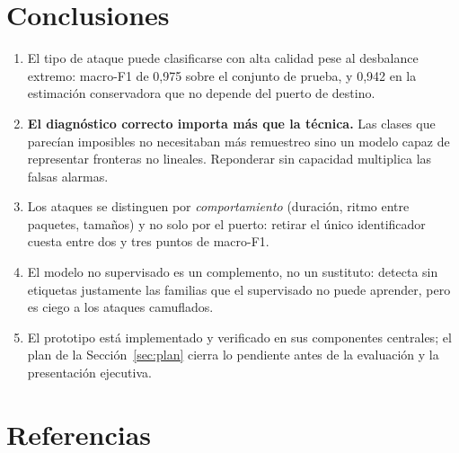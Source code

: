\documentclass[11pt,a4paper]{article}
\begin{document}
\section{Conclusiones}

\begin{enumerate}
\item El tipo de ataque puede clasificarse con alta calidad pese al
desbalance extremo: macro-F1 de 0,975 sobre el conjunto de prueba, y 0,942 en
la estimación conservadora que no depende del puerto de destino.
\item \textbf{El diagnóstico correcto importa más que la técnica.} Las clases
que parecían imposibles no necesitaban más remuestreo sino un modelo capaz de
representar fronteras no lineales. Reponderar sin capacidad multiplica las
falsas alarmas.
\item Los ataques se distinguen por \emph{comportamiento} (duración,
ritmo entre paquetes, tamaños) y no solo por el puerto: retirar el único
identificador cuesta entre dos y tres puntos de macro-F1.
\item El modelo no supervisado es un complemento, no un sustituto: detecta
sin etiquetas justamente las familias que el supervisado no puede aprender,
pero es ciego a los ataques camuflados.
\item El prototipo está implementado y verificado en sus componentes
centrales; el plan de la Sección~\ref{sec:plan} cierra lo pendiente antes de la evaluación
y la presentación ejecutiva.
\end{enumerate}

\section*{Referencias}
\end{document}
